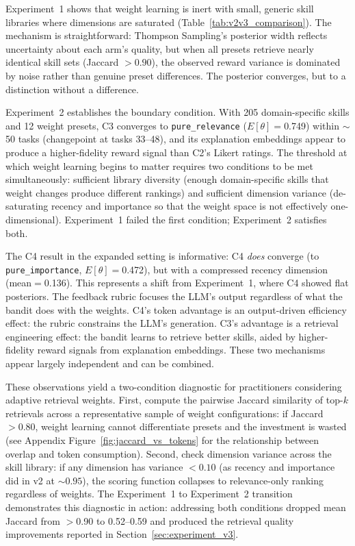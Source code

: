 Experiment~1 shows that weight learning is inert with small, generic skill libraries where dimensions are saturated (Table~\ref{tab:v2v3_comparison}).
The mechanism is straightforward: Thompson Sampling's posterior width reflects uncertainty about each arm's quality, but when all presets retrieve nearly identical skill sets (Jaccard $> 0.90$), the observed reward variance is dominated by noise rather than genuine preset differences.
The posterior converges, but to a distinction without a difference.

Experiment~2 establishes the boundary condition.
With 205 domain-specific skills and 12 weight presets, C3 converges to \texttt{pure\_relevance} ($E[\theta]{=}$0.749) within ${\sim}$50 tasks (changepoint at tasks 33--48), and its explanation embeddings appear to produce a higher-fidelity reward signal than C2's Likert ratings.
The threshold at which weight learning begins to matter requires two conditions to be met simultaneously: sufficient library diversity (enough domain-specific skills that weight changes produce different rankings) and sufficient dimension variance (de-saturating recency and importance so that the weight space is not effectively one-dimensional).
Experiment~1 failed the first condition; Experiment~2 satisfies both.

The C4 result in the expanded setting is informative: C4 \emph{does} converge (to \texttt{pure\_importance}, $E[\theta]{=}$0.472), but with a compressed recency dimension (mean${=}$0.136).
This represents a shift from Experiment~1, where C4 showed flat posteriors.
The feedback rubric focuses the LLM's output regardless of what the bandit does with the weights.
C4's token advantage is an output-driven efficiency effect: the rubric constrains the LLM's generation. C3's advantage is a retrieval engineering effect: the bandit learns to retrieve better skills, aided by higher-fidelity reward signals from explanation embeddings.
These two mechanisms appear largely independent and can be combined.

These observations yield a two-condition diagnostic for practitioners considering adaptive retrieval weights.
First, compute the pairwise Jaccard similarity of top-$k$ retrievals across a representative sample of weight configurations: if Jaccard $> 0.80$, weight learning cannot differentiate presets and the investment is wasted (see Appendix Figure~\ref{fig:jaccard_vs_tokens} for the relationship between overlap and token consumption).
Second, check dimension variance across the skill library: if any dimension has variance $< 0.10$ (as recency and importance did in v2 at ${\sim}0.95$), the scoring function collapses to relevance-only ranking regardless of weights.
The Experiment~1 to Experiment~2 transition demonstrates this diagnostic in action: addressing both conditions dropped mean Jaccard from $>$0.90 to 0.52--0.59 and produced the retrieval quality improvements reported in Section~\ref{sec:experiment_v3}.

